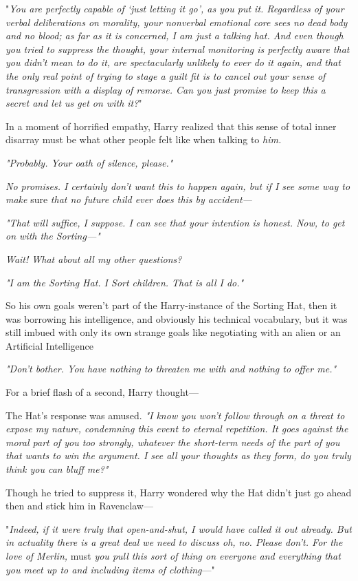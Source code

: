 "\emph{You are perfectly capable of `just letting it go', as you put it.
Regardless of your verbal deliberations on morality, your nonverbal emotional
core sees no dead body and no blood; as far as it is concerned, I am just a
talking hat. And even though you tried to suppress the thought, your internal
monitoring is perfectly aware that you didn't mean to do it, are spectacularly
unlikely to ever do it again, and that the only real point of trying to stage a
guilt fit is to cancel out your sense of transgression with a display of
remorse. Can you just promise to keep this a secret and let us get on with it?}"

In a moment of horrified empathy, Harry realized that this sense of total inner
disarray must be what other people felt like when talking to \emph{him.}

\emph{"Probably. Your oath of silence, please."}

\emph{No promises. I certainly don't want this to happen again, but if I see
some way to make} sure \emph{that no future child ever does this by accident---}

\emph{"That will suffice, I suppose. I can see that your intention is honest.
Now, to get on with the Sorting\mbox{---}"}

\emph{Wait! What about all my other questions?}

\emph{"I am the Sorting Hat. I Sort children. That is all I do."}

So his own goals weren't part of the Harry-instance of the Sorting Hat,
then{\el} it was borrowing his intelligence, and obviously his technical
vocabulary, but it was still imbued with only its own strange goals{\el}
like negotiating with an alien or an Artificial Intelligence{\el}

\emph{"Don't bother. You have nothing to threaten me with and nothing to offer
me."}

For a brief flash of a second, Harry thought---

The Hat's response was amused. \emph{"I know you won't follow through on a
threat to expose my nature, condemning this event to eternal repetition. It
goes against the moral part of you too strongly, whatever the short-term needs
of the part of you that wants to win the argument. I see all your thoughts as
they form, do you truly think you can bluff me?"}

Though he tried to suppress it, Harry wondered why the Hat didn't just go ahead
then and stick him in Ravenclaw---

"\emph{Indeed, if it were truly that open-and-shut, I would have called it out
already. But in actuality there is a great deal we need to discuss{\el} oh,
no. Please don't. For the love of Merlin,} must \emph{you pull this sort of
thing on everyone and everything that you meet up to and including items of
clothing}\mbox{---}"

